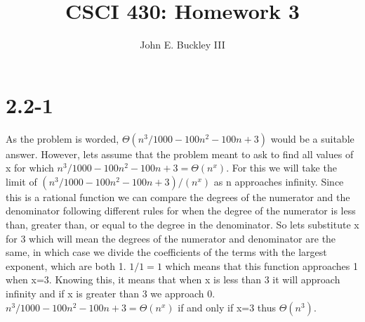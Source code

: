 \documentclass[12pt]{article}
\author{John E. Buckley III}
\title{CSCI 430: Homework 3}
\begin{document}
\maketitle

\section{2.2-1}
As the problem is worded, $\Theta(n^3/1000-100n^2-100n+3)$ would be a suitable answer. However, lets assume that the problem meant to ask to find all values of x for which $n^3/1000-100n^2-100n+3=\Theta(n^x)$. For this we will take the limit of $(n^3/1000-100n^2-100n+3)/(n^x)$ as n approaches infinity. Since this is a rational function we can compare the degrees of the numerator and the denominator following different rules for when the degree of the numerator is less than, greater than, or equal to the degree in the denominator. So lets substitute x for 3 which will mean the degrees of the numerator and denominator are the same, in which case we divide the coefficients of the terms with the largest exponent, which are both 1. $1/1=1$ which means that this function approaches 1 when x=3. Knowing this, it means that when x is less than 3 it will approach infinity and if x is greater than 3 we approach 0. $n^3/1000-100n^2-100n+3=\Theta(n^x)$ if and only if x=3 thus $\Theta(n^3)$.
\end{document}
